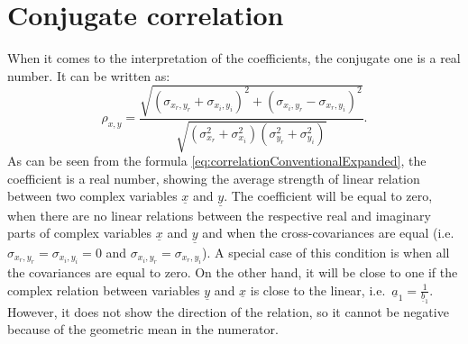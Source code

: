 \documentclass[
]{book}
\begin{document}
\hypertarget{correlationConjugate}{%
\section{Conjugate correlation}\label{correlationConjugate}}

When it comes to the interpretation of the coefficients, the conjugate one is a real number. It can be written as:
\begin{equation}
    {\rho}_{x,y} = \frac{\sqrt{(\sigma_{x_r, y_r} + \sigma_{x_i, y_i})^2 + (\sigma_{x_i, y_r} - \sigma_{x_r, y_i})^2}}{\sqrt{(\sigma_{x_r}^2 + \sigma_{x_i}^2)(\sigma_{y_r}^2 + \sigma_{y_i}^2)}} .
    \label{eq:correlationConventionalExpanded}
\end{equation}
As can be seen from the formula \eqref{eq:correlationConventionalExpanded}, the coefficient is a real number, showing the average strength of linear relation between two complex variables \(\underline{x}\) and \(\underline{y}\). The coefficient will be equal to zero, when there are no linear relations between the respective real and imaginary parts of complex variables \(\underline{x}\) and \(\underline{y}\) and when the cross-covariances are equal (i.e.~\(\sigma_{x_r, y_r}=\sigma_{x_i, y_i}=0\) and \(\sigma_{x_i, y_r} = \sigma_{x_r, y_i}\)). A special case of this condition is when all the covariances are equal to zero. On the other hand, it will be close to one if the complex relation between variables \(\underline{y}\) and \(\underline{x}\) is close to the linear, i.e.~\(\underline{a}_1 = \frac{1}{\underline{b}_1}\). However, it does not show the direction of the relation, so it cannot be negative because of the geometric mean in the numerator.
\end{document}
